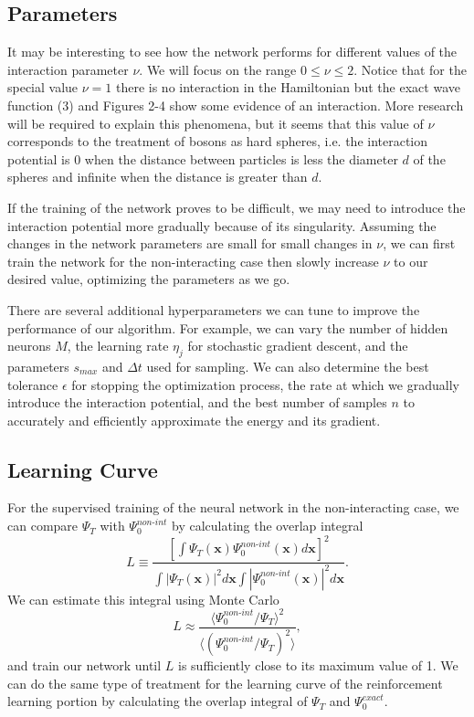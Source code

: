 \documentclass[prb,aps,twocolumn,showpacs,10pt]{revtex4-1}
\begin{document}

\subsection{Parameters}
It may be interesting to see how the network performs for different values of the interaction parameter $\nu$. We will focus on the range $0 \leq \nu \leq 2$. Notice that for the special value $\nu=1$ there is no interaction in the Hamiltonian but the exact wave function (3) and Figures 2-4 show some evidence of an interaction. More research will be required to explain this phenomena, but it seems that this value of $\nu$ corresponds to the treatment of bosons as hard spheres, i.e. the interaction potential is 0 when the distance between particles is less the diameter $d$ of the spheres and infinite when the distance is greater than $d$.  

If the training of the network proves to be difficult, we may need to introduce the interaction potential more gradually because of its singularity. Assuming the changes in the network parameters are small for small changes in $\nu$, we can first train the network for the non-interacting case then slowly increase $\nu$ to our desired value, optimizing the parameters as we go. 

There are several additional hyperparameters we can tune to improve the performance of our algorithm. For example, we can vary the number of hidden neurons $M$, the learning rate $\eta_j$ for stochastic gradient descent, and the parameters $s_{max}$ and $\Delta t$ used for sampling. We can also determine the best tolerance $\epsilon$ for stopping the optimization process, the rate at which we gradually introduce the interaction potential, and the best number of samples $n$ to accurately and efficiently approximate the energy and its gradient.


\subsection{Learning Curve}

For the supervised training of the neural network in the non-interacting case, we can compare $\Psi_T$ with $\Psi_0^{non\text{-}int}$ by calculating the overlap integral
\begin{equation}
L \equiv \frac{\left[ \int  \Psi_T(\bm{x}) \Psi_0^{non\text{-}int}(\bm{x}) d \bm{x} \right]^2}{\int |\Psi_T(\bm{x})|^2 d \bm{x} \int |\Psi_0^{non\text{-}int}(\bm{x})|^2 d \bm{x} }.
\end{equation}
We can estimate this integral using Monte Carlo
\begin{equation}
L \approx \frac{\langle \Psi_0^{non\text{-}int} /\Psi_T \rangle^2}{\langle  \left( \Psi_0^{non\text{-}int} /\Psi_T \right)^2 \rangle},
\end{equation}
and train our network until $L$ is sufficiently close to its maximum value of 1. We can do the same type of treatment for the learning curve of the reinforcement learning portion by calculating the overlap integral of $\Psi_T$ and $\Psi_0^{exact}$.
\end{document}
